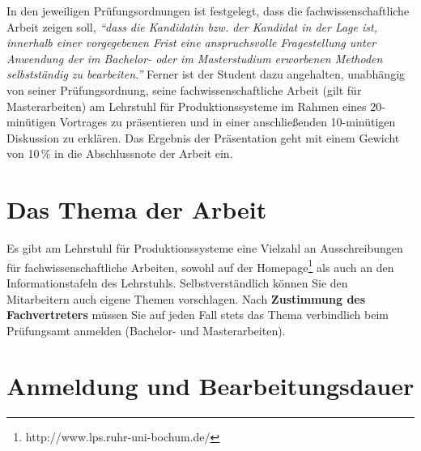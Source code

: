 In den jeweiligen Prüfungsordnungen ist festgelegt, dass die fachwissenschaftliche Arbeit zeigen soll, \emph{"`dass die Kandidatin bzw. der Kandidat in der Lage ist, innerhalb einer vorgegebenen Frist eine anspruchsvolle Fragestellung unter Anwendung der im Bachelor- oder im Masterstudium erworbenen Methoden selbstständig zu bearbeiten."'} Ferner ist der Student dazu angehalten, unabhängig von seiner Prüfungsordnung, seine fachwissenschaftliche Arbeit (gilt für Masterarbeiten) am Lehrstuhl für Produktionssysteme im Rahmen eines 20-minütigen Vortrages zu präsentieren und in einer anschließenden 10-minütigen Diskussion zu erklären. Das Ergebnis der Präsentation geht mit einem Gewicht von 10\,\% in die Abschlussnote der Arbeit ein.


\section{Das Thema der Arbeit}
\label{sec:Das Thema der Arbeit}

Es gibt am Lehrstuhl für Produktionssysteme eine Vielzahl an Ausschreibungen für fachwissenschaftliche Arbeiten, sowohl auf der Homepage\footnote{http://www.lps.ruhr-uni-bochum.de/} als auch an den Informationstafeln des Lehrstuhls. Selbstverständlich können Sie den Mitarbeitern auch eigene Themen vorschlagen. Nach \textbf{Zustimmung des Fachvertreters} müssen Sie auf jeden Fall stets das Thema verbindlich beim Prüfungsamt anmelden (Bachelor- und Masterarbeiten).


\section{Anmeldung und Bearbeitungsdauer}
\label{sec:Anmeldung und Bearbeitungsdauer}

